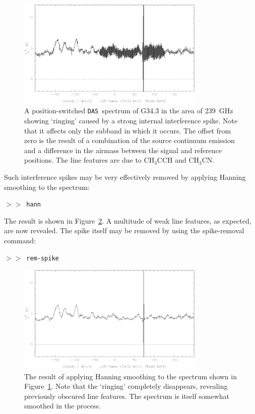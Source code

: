 \documentclass[11pt,twoside]{starlink}
\providecommand{\das}{\texttt{DAS}}
\providecommand{\SP}{{$>\!>$}}
\begin{document}
\begin{figure}[htb]
\centering
\includegraphics[width=0.8\textwidth]{sc8_spiked}
\caption[`Ringing' in a spectrum]
{\small{A position-switched \das\ spectrum of G34.3 in the area of
239~GHz showing `ringing' caused by a strong internal interference
spike. Note that it affects only the subband in which it occurs. The
offset from zero is the result of a combination of the source
continuum emission and a difference in the airmass between the signal
and reference positions. The line features are due to CH$_3$CCH and
CH$_3$CN.  }}
\label{fig:spikes}
\end{figure}

Such interference spikes may be very effectively removed by applying
Hanning smoothing to the spectrum:

\SP\ \texttt{hann}

The result is shown in Figure~\ref{fig:despiked}. A multitude of weak
line features, as expected, are now revealed. The spike itself may be
removed by using the spike-removal command:

\SP\ \texttt{rem-spike}

\begin{figure}[htb]
\centering
\includegraphics[width=0.8\textwidth]{sc8_despiked}
\caption[Hanning-smoothing removes `ringing']
{\small{The result of applying Hanning smoothing to the spectrum shown
in Figure~\ref{fig:spikes}. Note that the `ringing' completely
disappears, revealing previously obscured line features. The spectrum
is itself somewhat smoothed in the process.  }}
\label{fig:despiked}
\end{figure}
\end{document}
